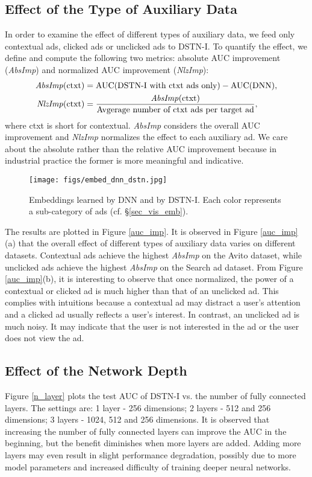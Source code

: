 \documentclass[sigconf]{acmart}
\begin{document}
\subsection{Effect of the Type of Auxiliary Data} \label{sec_aux_type}
In order to examine the effect of different types of auxiliary data, we feed only contextual ads, clicked ads or unclicked ads to DSTN-I.
To quantify the effect, we define and compute the following two metrics: absolute AUC improvement (\emph{AbsImp}) and normalized AUC improvement (\emph{NlzImp}):
\begin{align}
\textrm{\emph{AbsImp}(ctxt)} & = \textrm{AUC(DSTN-I with ctxt ads only)} - \textrm{AUC(DNN)}, \nonumber \\
\textrm{\emph{NlzImp}(ctxt)} &= \frac{\textrm{\emph{AbsImp}(ctxt)}}{\textrm{Avgerage number of ctxt ads per target ad}}, \nonumber
\end{align}
where ctxt is short for contextual.
\emph{AbsImp} considers the overall AUC improvement and \emph{NlzImp} normalizes the effect to each auxiliary ad.
We care about the absolute rather than the relative AUC improvement because in industrial practice the former is more meaningful and indicative.

\begin{figure}[!t]
\centering
\texttt{[image: figs/embed\_dnn\_dstn.jpg]}
\vskip -8pt
\caption{Embeddings learned by DNN and by DSTN-I. Each color represents a sub-category of ads (cf. \S\ref{sec_vis_emb}).}
\vskip -5pt
\label{embed_dstn}
\end{figure}

The results are plotted in Figure \ref{auc_imp}. It is observed in Figure \ref{auc_imp}(a) that the overall effect of different types of auxiliary data varies on different datasets. Contextual ads achieve the highest \emph{AbsImp} on the Avito dataset, while unclicked ads achieve the highest \emph{AbsImp} on the Search ad dataset.
From Figure \ref{auc_imp}(b), it is interesting to observe that once normalized, the power of a contextual or clicked ad is much higher than that of an unclicked ad. This complies with intuitions because a contextual ad may distract a user's attention and a clicked ad usually reflects a user's interest. In contrast, an unclicked ad is much noisy. It may indicate that the user is not interested in the ad or the user does not view the ad.

\subsection{Effect of the Network Depth}
Figure \ref{n_layer} plots the test AUC of DSTN-I vs. the number of fully connected layers. The settings are: 1 layer - 256 dimensions; 2 layers - 512 and 256 dimensions; 3 layers - 1024, 512 and 256 dimensions. It is observed that increasing the number of fully connected layers can improve the AUC in the beginning, but the benefit diminishes when more layers are added. Adding more layers may even result in slight performance degradation, possibly due to more model parameters and increased difficulty of training deeper neural networks.
\end{document}
